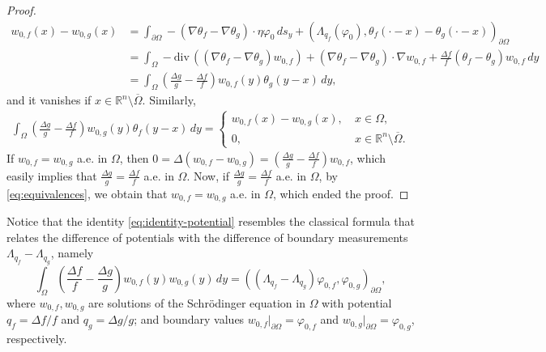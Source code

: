 \documentclass[12pt]{article}
\def\div{\mbox{div}\,}
\def\R{\mathbb{R}}
\begin{document}
\begin{proof}
\begin{align}
w_{0,f}(x)-w_{0,g}(x)&=\int_{\partial\Omega} -\left(\nabla \theta_f-\nabla \theta_g\right)\cdot \eta \varphi_0 \, ds_y+ \left(\Lambda_{q_f}(\varphi_0), \theta_f(\cdot-x)-\theta_g(\cdot-x)\right)_{\partial\Omega}\nonumber\\
&=\int_{\Omega} -\div(\left(\nabla \theta_f-\nabla \theta_g\right)w_{0,f})+ \left(\nabla \theta_f-\nabla \theta_g \right)\cdot \nabla w_{0,f}+\frac{\Delta f}{f}(\theta_f-\theta_g)w_{0,f} \, dy\nonumber\\
&=\int_{\Omega} \left(\frac{\Delta g}{g}-\frac{\Delta f}{f}\right) w_{0,f}(y)\theta_g(y-x)\, dy,
\end{align}
and it vanishes if $x\in \mathbb{R}^n\setminus \overline{\Omega}$. Similarly,
\begin{align*}
    \int_{\Omega} \left(\frac{\Delta g}{g}-\frac{\Delta f}{f}\right) w_{0,g}(y)\theta_f(y-x)\, dy=\left\{
   \begin{array}{ll}
      w_{0,f}(x)-w_{0,g}(x), \ & x\in \Omega,\\
      0,           & x\in \R^n\setminus \overline{\Omega}.
   \end{array}
\right.
\end{align*}
If $w_{0,f}=w_{0,g}$ a.e. in $\Omega$, then $0=\Delta(w_{0,f}-w_{0,g})=\left(\frac{\Delta g}{g}-\frac{\Delta f}{f}\right)w_{0,f}$, which easily implies that $\frac{\Delta g}{g}=\frac{\Delta f}{f}$ a.e. in $\Omega$. Now, if $\frac{\Delta g}{g}=\frac{\Delta f}{f}$ a.e. in $\Omega$, by \eqref{eq:equivalences}, we obtain that $w_{0,f}=w_{0,g}$ a.e. in $\Omega$, which ended the proof.
\end{proof}
Notice that the identity \eqref{eq:identity-potential} resembles the classical formula that relates the difference of potentials with the difference of boundary measurements $\Lambda_{q_f}-\Lambda_{q_g}$, namely
\[
\int_{\Omega}\left(\frac{\Delta f}{f}-\frac{\Delta g}{g}\right) w_{0,f}(y) w_{0,g}(y)\, dy=\left((\Lambda_{q_f}-\Lambda_{q_g})\varphi_{0,f}, \varphi_{0,g}\right)_{\partial\Omega},
\]
where $w_{0,f}, w_{0,g}$ are solutions of the Schr\"{o}dinger equation in $\Omega$ with potential $q_f=\Delta f/f$ and $q_g=\Delta g/g$; and boundary values $w_{0,f}|_{\partial\Omega}=\varphi_{0,f}$ and $w_{0,g}|_{\partial\Omega}=\varphi_{0,g}$, respectively.
\end{document}
